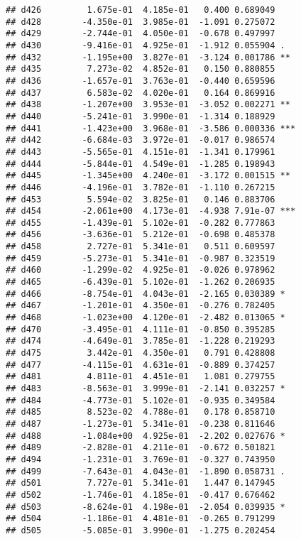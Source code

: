 \documentclass[
]{article}
\begin{document}
\begin{verbatim}
## d426         1.675e-01  4.185e-01   0.400 0.689049    
## d428        -4.350e-01  3.985e-01  -1.091 0.275072    
## d429        -2.744e-01  4.050e-01  -0.678 0.497997    
## d430        -9.416e-01  4.925e-01  -1.912 0.055904 .  
## d432        -1.195e+00  3.827e-01  -3.124 0.001786 ** 
## d435         7.273e-02  4.852e-01   0.150 0.880855    
## d436        -1.657e-01  3.763e-01  -0.440 0.659596    
## d437         6.583e-02  4.020e-01   0.164 0.869916    
## d438        -1.207e+00  3.953e-01  -3.052 0.002271 ** 
## d440        -5.241e-01  3.990e-01  -1.314 0.188929    
## d441        -1.423e+00  3.968e-01  -3.586 0.000336 ***
## d442        -6.684e-03  3.972e-01  -0.017 0.986574    
## d443        -5.565e-01  4.151e-01  -1.341 0.179961    
## d444        -5.844e-01  4.549e-01  -1.285 0.198943    
## d445        -1.345e+00  4.240e-01  -3.172 0.001515 ** 
## d446        -4.196e-01  3.782e-01  -1.110 0.267215    
## d453         5.594e-02  3.825e-01   0.146 0.883706    
## d454        -2.061e+00  4.173e-01  -4.938 7.91e-07 ***
## d455        -1.439e-01  5.102e-01  -0.282 0.777863    
## d456        -3.636e-01  5.212e-01  -0.698 0.485378    
## d458         2.727e-01  5.341e-01   0.511 0.609597    
## d459        -5.273e-01  5.341e-01  -0.987 0.323519    
## d460        -1.299e-02  4.925e-01  -0.026 0.978962    
## d465        -6.439e-01  5.102e-01  -1.262 0.206935    
## d466        -8.754e-01  4.043e-01  -2.165 0.030389 *  
## d467        -1.201e-01  4.350e-01  -0.276 0.782405    
## d468        -1.023e+00  4.120e-01  -2.482 0.013065 *  
## d470        -3.495e-01  4.111e-01  -0.850 0.395285    
## d474        -4.649e-01  3.785e-01  -1.228 0.219293    
## d475         3.442e-01  4.350e-01   0.791 0.428808    
## d477        -4.115e-01  4.631e-01  -0.889 0.374257    
## d481         4.811e-01  4.451e-01   1.081 0.279755    
## d483        -8.563e-01  3.999e-01  -2.141 0.032257 *  
## d484        -4.773e-01  5.102e-01  -0.935 0.349584    
## d485         8.523e-02  4.788e-01   0.178 0.858710    
## d487        -1.273e-01  5.341e-01  -0.238 0.811646    
## d488        -1.084e+00  4.925e-01  -2.202 0.027676 *  
## d489        -2.828e-01  4.211e-01  -0.672 0.501821    
## d494        -1.231e-01  3.769e-01  -0.327 0.743950    
## d499        -7.643e-01  4.043e-01  -1.890 0.058731 .  
## d501         7.727e-01  5.341e-01   1.447 0.147945    
## d502        -1.746e-01  4.185e-01  -0.417 0.676462    
## d503        -8.624e-01  4.198e-01  -2.054 0.039935 *  
## d504        -1.186e-01  4.481e-01  -0.265 0.791299    
## d505        -5.085e-01  3.990e-01  -1.275 0.202454    

\end{verbatim}
\end{document}
